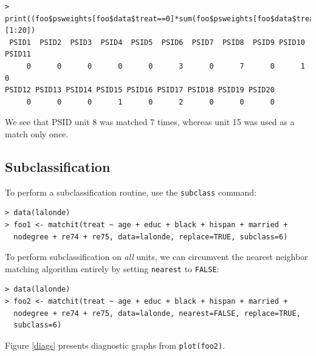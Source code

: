\documentclass[oneside,letterpaper,titlepage]{article}
\begin{document}
\begin{verbatim}
> print((foo$psweights[foo$data$treat==0]*sum(foo$psweights[foo$data$treat==1])/sum(foo$psweights[foo$data$treat==0]))[1:20])
 PSID1  PSID2  PSID3  PSID4  PSID5  PSID6  PSID7  PSID8  PSID9 PSID10 PSID11
     0      0      0      0      0      3      0      7      0      1      0
PSID12 PSID13 PSID14 PSID15 PSID16 PSID17 PSID18 PSID19 PSID20
     0      0      0      1      0      2      0      0      0
\end{verbatim}

We see that PSID unit 8 was matched 7 times, whereas unit 15 was used as a match only once.  

\subsection{Subclassification}

To perform a subclassification routine, use the \texttt{subclass}
command:

\begin{verbatim}
> data(lalonde) 
> foo1 <- matchit(treat ~ age + educ + black + hispan + married +
  nodegree + re74 + re75, data=lalonde, replace=TRUE, subclass=6)
\end{verbatim}

To perform subclassification on \emph{all} units, we can circumvent
the nearest neighbor matching algorithm entirely by setting
\texttt{nearest} to \texttt{FALSE}:

\begin{verbatim}
> data(lalonde) 
> foo2 <- matchit(treat ~ age + educ + black + hispan + married +
  nodegree + re74 + re75, data=lalonde, nearest=FALSE, replace=TRUE,
  subclass=6)
\end{verbatim}

Figure \ref{diags} presents diagnostic graphs from \texttt{plot(foo2)}.  
\end{document}
